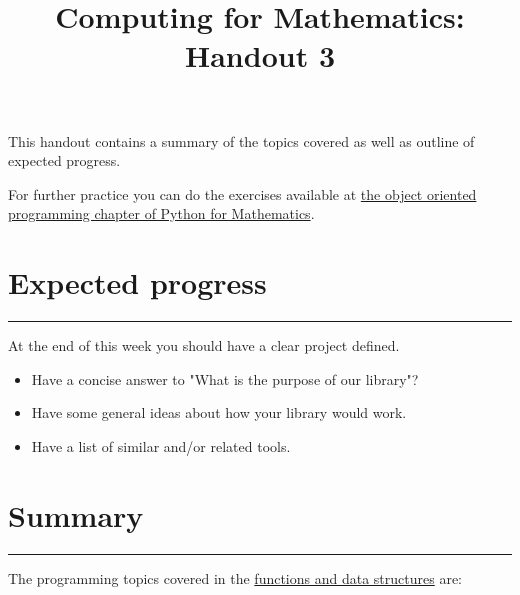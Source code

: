 \documentclass{article}
\title{Computing for Mathematics: Handout 3}
\date{}
\begin{document}
\maketitle


This handout contains a summary of the topics covered as well as outline of
expected progress.

For further practice you can do the exercises available at 
\href{https://vknight.org/pfm/building-tools/03-object-oriented-programming/exercises/main.html}{the
object oriented programming chapter of Python for Mathematics}.

\section{Expected progress}
\hrule

At the end of this week you should have a clear project defined.

\begin{itemize}
    \item Have a concise answer to "What is the purpose of our library"?
    \item Have some general ideas about how your library would work.
    \item Have a list of similar and/or related tools.
\end{itemize}

\begin{center}
\end{center}

\section{Summary}\label{summary}
\hrule

The programming topics covered in the
\href{https://vknight.org/pfm/building-tools/03-object-oriented-programming/introduction/main.html}{functions
and data structures} are:

\end{document}
